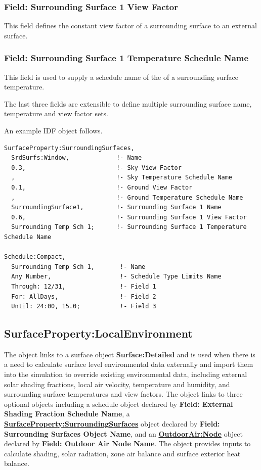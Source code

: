 \subsubsection{Field: Surrounding Surface 1 View Factor}\label{field-surrounding-surface-1-view-factor}

This field defines the constant view factor of a surrounding surface to an external surface.

\subsubsection{Field: Surrounding Surface 1 Temperature Schedule Name}\label{field-surrounding-surface-1-temp-schedule-name}

This field is used to supply a schedule name of the of a surrounding surface temperature.

The last three fields are extensible to define multiple surrounding surface name, temperature and view factor sets.

An example IDF object follows.

\begin{lstlisting}
SurfaceProperty:SurroundingSurfaces,
  SrdSurfs:Window,             !- Name
  0.3,                         !- Sky View Factor
  ,                            !- Sky Temperature Schedule Name
  0.1,                         !- Ground View Factor
  ,                            !- Ground Temperature Schedule Name
  SurroundingSurface1,         !- Surrounding Surface 1 Name
  0.6,                         !- Surrounding Surface 1 View Factor
  Surrounding Temp Sch 1;      !- Surrounding Surface 1 Temperature Schedule Name

Schedule:Compact,
  Surrounding Temp Sch 1,       !- Name
  Any Number,                   !- Schedule Type Limits Name
  Through: 12/31,               !- Field 1
  For: AllDays,                 !- Field 2
  Until: 24:00, 15.0;           !- Field 3
\end{lstlisting}

\subsection{SurfaceProperty:LocalEnvironment}\label{surfacePropertylocalEnvironment}

The object links to a surface object \textbf{Surface:Detailed} and is used when there is a need to calculate surface level environmental data externally and import them into the simulation to override existing environmental data, including external solar shading fractions, local air velocity, temperature and humidity, and surrounding surface temperatures and view factors. The object links to three optional objects including a schedule object declared by \textbf{Field: External Shading Fraction Schedule Name}, a \textbf{\hyperref[surfacePropertysurroundingSurfaces]{SurfaceProperty:SurroundingSurfaces}} object declared by \textbf{Field: Surrounding Surfaces Object Name}, and an \textbf{\hyperref[outdoorairnode]{OutdoorAir:Node}} object declared by \textbf{Field: Outdoor Air Node Name}. The object provides inputs to calculate shading, solar radiation, zone air balance and surface exterior heat balance.

